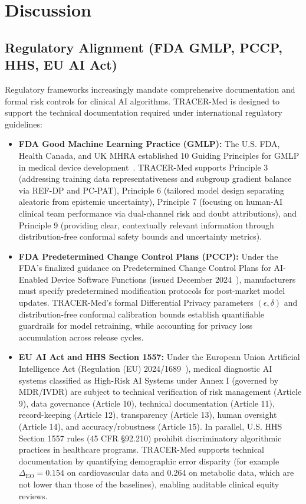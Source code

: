 \documentclass[pdflatex,sn-vancouver-num,referee,lineno]{sn-jnl}
\theoremstyle{thmstyleone}
\theoremstyle{thmstylethree}
\begin{document}
\section{Discussion}
\label{sec:governance}

\subsection{Regulatory Alignment (FDA GMLP, PCCP, HHS, EU AI Act)}
Regulatory frameworks increasingly mandate comprehensive documentation and formal risk controls for clinical AI algorithms. TRACER-Med is designed to support the technical documentation required under international regulatory guidelines:
\begin{itemize}
    \item \textbf{FDA Good Machine Learning Practice (GMLP):} The U.S. FDA, Health Canada, and UK MHRA established 10 Guiding Principles for GMLP in medical device development~\cite{fda2021gmlp}. TRACER-Med supports Principle 3 (addressing training data representativeness and subgroup gradient balance via REF-DP and PC-PAT), Principle 6 (tailored model design separating aleatoric from epistemic uncertainty), Principle 7 (focusing on human-AI clinical team performance via dual-channel risk and doubt attributions), and Principle 9 (providing clear, contextually relevant information through distribution-free conformal safety bounds and uncertainty metrics).
    \item \textbf{FDA Predetermined Change Control Plans (PCCP):} Under the FDA's finalized guidance on Predetermined Change Control Plans for AI-Enabled Device Software Functions (issued December 2024~\cite{fda2024pccp}), manufacturers must specify predetermined modification protocols for post-market model updates. TRACER-Med's formal Differential Privacy parameters $(\epsilon, \delta)$ and distribution-free conformal calibration bounds establish quantifiable guardrails for model retraining, while accounting for privacy loss accumulation across release cycles.
    \item \textbf{EU AI Act and HHS Section 1557:} Under the European Union Artificial Intelligence Act (Regulation (EU) 2024/1689~\cite{euaiact2024}), medical diagnostic AI systems classified as High-Risk AI Systems under Annex I (governed by MDR/IVDR) are subject to technical verification of risk management (Article 9), data governance (Article 10), technical documentation (Article 11), record-keeping (Article 12), transparency (Article 13), human oversight (Article 14), and accuracy/robustness (Article 15). In parallel, U.S. HHS Section 1557 rules (45 CFR §92.210) prohibit discriminatory algorithmic practices in healthcare programs. TRACER-Med supports technical documentation by quantifying demographic error disparity (for example $\Delta_{\text{EO}} = 0.154$ on cardiovascular data and $0.264$ on metabolic data, which are not lower than those of the baselines), enabling auditable clinical equity reviews.
\end{itemize}
\end{document}
